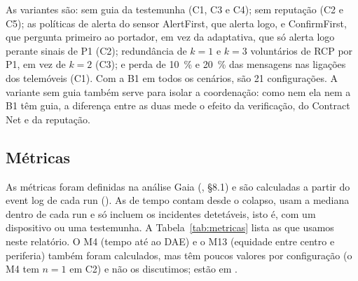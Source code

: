 \documentclass[11pt,a4paper]{article}
\begin{document}
As variantes são: sem guia da testemunha (C1, C3 e C4); sem reputação (C2 e C5); as políticas de alerta do sensor AlertFirst, que alerta logo, e ConfirmFirst, que pergunta primeiro ao portador, em vez da adaptativa, que só alerta logo perante sinais de P1 (C2); redundância de $k = 1$ e $k = 3$ voluntários de RCP por P1, em vez de $k = 2$ (C3); e perda de 10~\% e 20~\% das mensagens nas ligações dos telemóveis (C1). Com a B1 em todos os cenários, são 21 configurações. A variante sem guia também serve para isolar a coordenação: como nem ela nem a B1 têm guia, a diferença entre as duas mede o efeito da verificação, do Contract Net e da reputação.

\subsection{Métricas}

As métricas foram definidas na análise Gaia (, §8.1) e são calculadas a partir do event log de cada run (). As de tempo contam desde o colapso, usam a mediana dentro de cada run e só incluem os incidentes detetáveis, isto é, com um dispositivo ou uma testemunha. A Tabela~\ref{tab:metricas} lista as que usamos neste relatório. O M4 (tempo até ao DAE) e o M13 (equidade entre centro e periferia) também foram calculados, mas têm poucos valores por configuração (o M4 tem $n = 1$ em C2) e não os discutimos; estão em .
\end{document}
